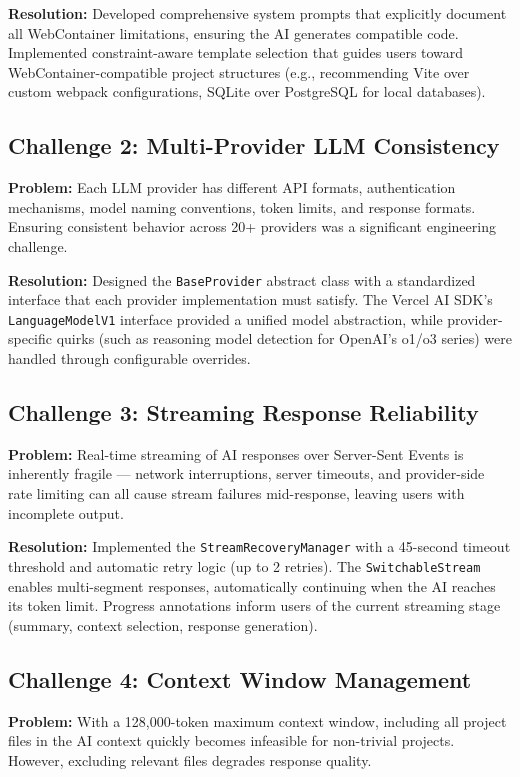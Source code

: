 \documentclass[12pt,a4paper,openany]{report}
\begin{document}
\textbf{Resolution:} Developed comprehensive system prompts that explicitly document all WebContainer limitations, ensuring the AI generates compatible code. Implemented constraint-aware template selection that guides users toward WebContainer-compatible project structures (e.g., recommending Vite over custom webpack configurations, SQLite over PostgreSQL for local databases).

\subsection{Challenge 2: Multi-Provider LLM Consistency}
\textbf{Problem:} Each LLM provider has different API formats, authentication mechanisms, model naming conventions, token limits, and response formats. Ensuring consistent behavior across 20+ providers was a significant engineering challenge.

\textbf{Resolution:} Designed the \texttt{BaseProvider} abstract class with a standardized interface that each provider implementation must satisfy. The Vercel AI SDK's \texttt{LanguageModelV1} interface provided a unified model abstraction, while provider-specific quirks (such as reasoning model detection for OpenAI's o1/o3 series) were handled through configurable overrides.

\subsection{Challenge 3: Streaming Response Reliability}
\textbf{Problem:} Real-time streaming of AI responses over Server-Sent Events is inherently fragile --- network interruptions, server timeouts, and provider-side rate limiting can all cause stream failures mid-response, leaving users with incomplete output.

\textbf{Resolution:} Implemented the \texttt{StreamRecoveryManager} with a 45-second timeout threshold and automatic retry logic (up to 2 retries). The \texttt{SwitchableStream} enables multi-segment responses, automatically continuing when the AI reaches its token limit. Progress annotations inform users of the current streaming stage (summary, context selection, response generation).

\subsection{Challenge 4: Context Window Management}
\textbf{Problem:} With a 128,000-token maximum context window, including all project files in the AI context quickly becomes infeasible for non-trivial projects. However, excluding relevant files degrades response quality.
\end{document}
